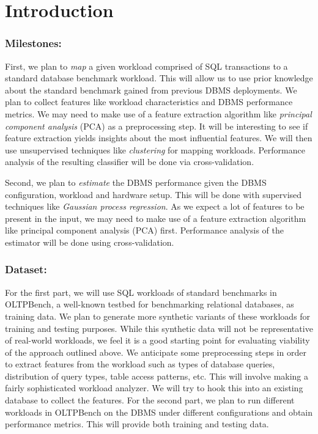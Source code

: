 \section{Introduction} \label{sec:intro}

\subsubsection*{Milestones:} 

First, we plan to \textit{map} a given workload comprised of 
SQL transactions to a standard database benchmark workload. This will 
allow us to use prior knowledge about the standard benchmark gained from
previous DBMS deployments. We plan to collect features like
workload characteristics and DBMS performance metrics. 
We may need to make use of a feature extraction algorithm like 
\textit{principal component analysis} (PCA) as a preprocessing step.
It will be interesting to see if feature extraction yields insights 
about the most influential features.
We will then
use unsupervised techniques like \textit{clustering} for mapping workloads. 
Performance analysis of the resulting classifier will be done via 
cross-validation.

Second, we plan to \textit{estimate} the DBMS performance given the DBMS 
configuration, workload and hardware setup. This will be done
with supervised techniques like \textit{Gaussian process regression}. 
As we expect a lot of features to be present in the input, we may 
need to make use of a feature extraction algorithm like 
principal component analysis (PCA) first. 
Performance analysis of the estimator will be done using cross-validation.

\subsubsection*{Dataset:} 

For the first part, we will use SQL workloads of standard benchmarks
in OLTPBench\citep{oltpbench14}, a well-known testbed for benchmarking 
relational databases, as training data. We plan to generate 
more synthetic variants of these workloads for training and testing
purposes. While this synthetic data will not be representative of 
real-world workloads, we feel it is a good starting point for 
evaluating viability of the approach outlined above.
We anticipate some preprocessing steps in order to extract
features from the workload such as types of database queries, 
distribution of query types, table access patterns, etc. This will 
involve making a fairly sophisticated workload analyzer. We will try 
to hook this into an existing database to collect the features.
For the second part, we plan to run different workloads in OLTPBench  
on the DBMS under different configurations and obtain performance metrics. 
This will provide both training and testing data.


